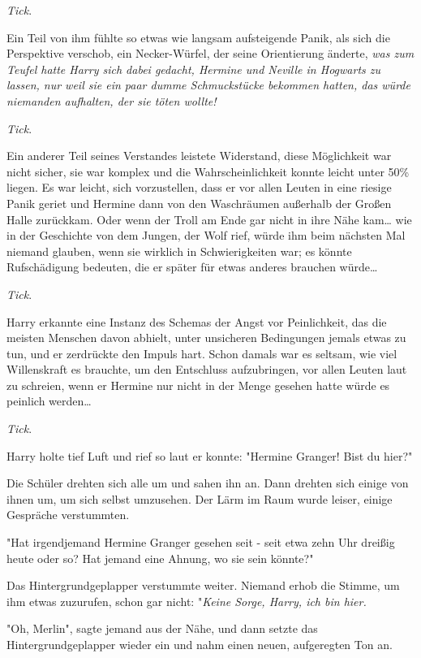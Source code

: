{\emph{Tick}.

Ein Teil von ihm fühlte so etwas wie langsam aufsteigende Panik, als sich die Perspektive verschob, ein Necker-Würfel, der seine Orientierung änderte, \emph{was zum Teufel hatte Harry sich dabei gedacht, Hermine und Neville in Hogwarts zu lassen, nur weil sie ein paar dumme Schmuckstücke bekommen hatten, das würde niemanden aufhalten, der sie töten wollte!}

\emph{Tick}.

Ein anderer Teil seines Verstandes leistete Widerstand, diese Möglichkeit war nicht sicher, sie war komplex und die Wahrscheinlichkeit konnte leicht unter 50\% liegen. Es war leicht, sich vorzustellen, dass er vor allen Leuten in eine riesige Panik geriet und Hermine dann von den Waschräumen außerhalb der Großen Halle zurückkam. Oder wenn der Troll am Ende gar nicht in ihre Nähe kam… wie in der Geschichte von dem Jungen, der Wolf rief, würde ihm beim nächsten Mal niemand glauben, wenn sie wirklich in Schwierigkeiten war; es könnte Rufschädigung bedeuten, die er später für etwas anderes brauchen würde…

\emph{Tick}.

Harry erkannte eine Instanz des Schemas der Angst vor Peinlichkeit, das die meisten Menschen davon abhielt, unter unsicheren Bedingungen jemals etwas zu tun, und er zerdrückte den Impuls hart. Schon damals war es seltsam, wie viel Willenskraft es brauchte, um den Entschluss aufzubringen, vor allen Leuten laut zu schreien, wenn er Hermine nur nicht in der Menge gesehen hatte würde es peinlich werden…

\emph{Tick}.

Harry holte tief Luft und rief so laut er konnte: "Hermine Granger! Bist du hier?"

Die Schüler drehten sich alle um und sahen ihn an. Dann drehten sich einige von ihnen um, um sich selbst umzusehen. Der Lärm im Raum wurde leiser, einige Gespräche verstummten.

"Hat irgendjemand Hermine Granger gesehen seit - seit etwa zehn Uhr dreißig heute oder so? Hat jemand eine Ahnung, wo sie sein könnte?"

Das Hintergrundgeplapper verstummte weiter. Niemand erhob die Stimme, um ihm etwas zuzurufen, schon gar nicht: "\emph{Keine Sorge, Harry, ich bin hier.}

"Oh, Merlin", sagte jemand aus der Nähe, und dann setzte das Hintergrundgeplapper wieder ein und nahm einen neuen, aufgeregten Ton an.

}
